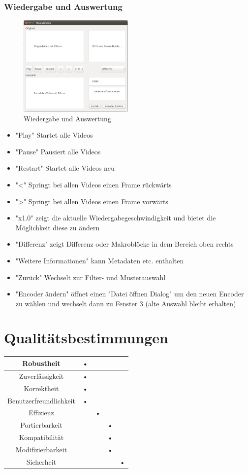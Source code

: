 \documentclass[parskip=full]{scrartcl}
\begin{document}
\subsubsection{Wiedergabe und Auswertung}
\begin{figure}[htbp]
\centering
\includegraphics[width=0.5\textwidth]{GUI_Entwurf_1/GUI_4.png}
\caption{Wiedergabe und Auswertung}
\end{figure}
\begin{itemize}
\item "Play" Startet alle Videos
\item "Pause" Pausiert alle Videos
\item "Restart" Startet alle Videos neu
\item "<" Springt bei allen Videos einen Frame rückwärts
\item ">" Springt bei allen Videos einen Frame vorwärts
\item "x1.0" zeigt die aktuelle Wiedergabegeschwindigkeit und bietet die Möglichkeit diese zu ändern
\item "Differenz" zeigt Differenz oder Makroblöcke in dem Bereich oben rechts
\item "Weitere Informationen" kann Metadaten etc. enthalten
\item "Zurück" Wechselt zur Filter- und Musterauswahl
\item "Encoder ändern" öffnet einen "Datei öffnen Dialog" um den neuen Encoder zu wählen und wechselt dann zu Fenster 3 (alte Auswahl bleibt erhalten)
\end{itemize}
\newpage
\section{Qualitätsbestimmungen}
\begin{tabular}{|c|c|c|c|c|}
\hline Robustheit & • &  &  & \\ 
\hline Zuverlässigkeit & • &  &  & \\ 
\hline Korrektheit & • &  &  & \\ 
\hline Benutzerfreundlichkeit & • &  &  & \\ 
\hline Effizienz &  & • &  & \\ 
\hline Portierbarkeit &  &  & • & \\ 
\hline Kompatibilität &  &  & • & \\ 
\hline Modifizierbarkeit &  &  & • & \\ 
\hline Sicherheit &  &  &  & • \\ 
\hline 
\end{tabular} 
\newpage
\end{document}
